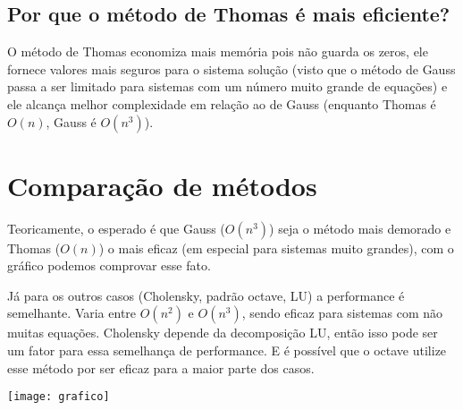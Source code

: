 \documentclass[12pt]{article}
\begin{document}
\subsection{Por que o método de Thomas é mais eficiente?}

O método de Thomas economiza mais memória pois não guarda os zeros, ele fornece valores mais seguros para o sistema solução (visto que o método de Gauss passa a ser limitado para sistemas com um número muito grande de equações) e ele alcança melhor complexidade em relação ao de Gauss (enquanto Thomas é \(O(n)\), Gauss é \(O(n^3)\)).

\section{Comparação de métodos}

Teoricamente, o esperado é que Gauss (\(O(n^3)\)) seja o método mais demorado e Thomas (\(O(n)\)) o mais eficaz (em especial para sistemas muito grandes), com o gráfico podemos comprovar esse fato.

Já para os outros casos (Cholensky, padrão octave, LU) a performance é semelhante. Varia entre \(O(n^2)\) e \(O(n^3)\), sendo eficaz para sistemas com não muitas equações. Cholensky depende da decomposição LU, então isso pode ser um fator para essa semelhança de performance. E é possível que o octave utilize esse método por ser eficaz para a maior parte dos casos.


\texttt{[image: grafico]}
\end{document}
